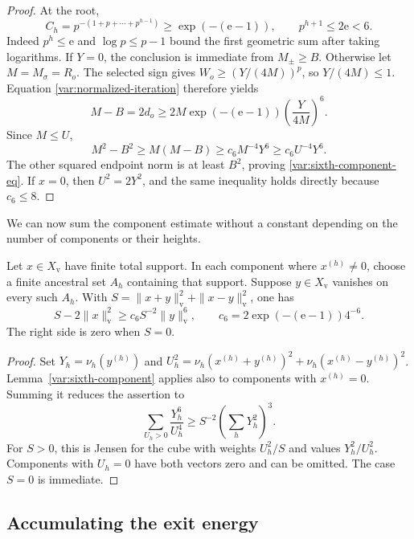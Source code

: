 \begin{proof}
At the root,
\[
 C_h=p^{-(1+p+\cdots+p^{h-1})}\ge\exp(-(\mathrm e-1)),
 \qquad p^{h+1}\le2\mathrm e<6.
\]
Indeed $p^h\le\mathrm e$ and $\log p\le p-1$ bound the first
geometric sum after taking logarithms.  If $Y=0$, the conclusion is
immediate from $M_\pm\ge B$.  Otherwise let $M=M_\sigma=R_o$.
The selected sign gives $W_o\ge(Y/(4M))^p$, so $Y/(4M)\le1$.
Equation \eqref{var:normalized-iteration} therefore yields
\[
 M-B=2d_o\ge
 2M\exp(-(\mathrm e-1))\left(\frac{Y}{4M}\right)^6.
\]
Since $M\le U$,
\[
 M^2-B^2\ge M(M-B)\ge c_6M^{-4}Y^6
                         \ge c_6U^{-4}Y^6.
\]
The other squared endpoint norm is at least $B^2$, proving
\eqref{var:sixth-component-eq}.  If $x=0$, then $U^2=2Y^2$,
and the same inequality holds directly because $c_6\le8$.
\end{proof}

We can now sum the component estimate without a constant depending
on the number of components or their heights.

\begin{theorem}\label{var:sixth-stability}
Let $x\in X_{\mathrm v}$ have finite total support.  In each component
where $x^{(h)}\ne0$, choose a finite ancestral set $A_h$ containing
that support.  Suppose $y\in X_{\mathrm v}$ vanishes on every such
$A_h$.  With
$S=\|x+y\|_{\mathrm v}^2+\|x-y\|_{\mathrm v}^2$, one has
\begin{equation}\label{var:sixth-sum}
 S-2\|x\|_{\mathrm v}^2
 \ge c_6 S^{-2}\|y\|_{\mathrm v}^6,
 \qquad c_6=2\exp(-(\mathrm e-1))4^{-6}.
\end{equation}
The right side is zero when $S=0$.
\end{theorem}

\begin{proof}
Set $Y_h=\nu_h(y^{(h)})$ and
$U_h^2=\nu_h(x^{(h)}+y^{(h)})^2+
        \nu_h(x^{(h)}-y^{(h)})^2$.
Lemma~\ref{var:sixth-component} applies also to components with
$x^{(h)}=0$.  Summing it reduces the assertion to
\[
 \sum_{U_h>0}\frac{Y_h^6}{U_h^4}
 \ge S^{-2}\left(\sum_hY_h^2\right)^3.
\]
For $S>0$, this is Jensen for the cube with weights $U_h^2/S$ and
values $Y_h^2/U_h^2$.  Components with $U_h=0$ have both vectors
zero and can be omitted.  The case $S=0$ is immediate.
\end{proof}

\subsection{Accumulating the exit energy}

